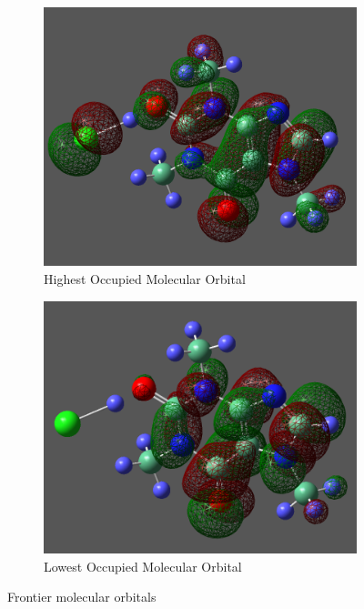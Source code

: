\documentclass{report}
\begin{document}
            \begin{figure}[h]
                \centering
                \begin{subfigure}[b]{0.45\textwidth}
                    \centering
                    \includegraphics[width=\textwidth]{images/HOMO.png}
                    \caption{Highest Occupied Molecular Orbital}
                    \label{fig:HOMO}
                \end{subfigure}
                \hfill
                \begin{subfigure}[b]{0.45\textwidth}
                    \centering
                    \includegraphics[width=\textwidth]{images/LUMO.png}
                    \caption{Lowest Occupied Molecular Orbital}
                    \label{fig:LUMO}
                \end{subfigure}
                \caption{Frontier molecular orbitals}
                \label{fig:frontierOrbitals}
            \end{figure}
\end{document}
